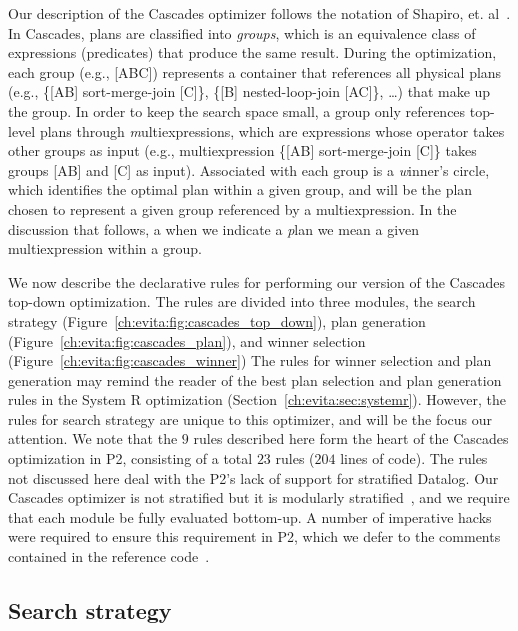 Our description of the Cascades optimizer follows the notation of Shapiro, et.
al~\cite{Shapiro-opt}.  In Cascades, plans are classified into {\em groups},
which is an equivalence class of expressions (predicates) that produce the same
result.  During the optimization, each group (e.g., [ABC]) represents a
container that references all physical plans (e.g., \{[AB] sort-merge-join
[C]\}, \{[B] nested-loop-join [AC]\}, \ldots) that make up the group.  In order
to keep the search space small, a group only references top-level plans through
{\emph multiexpressions}, which are expressions whose operator takes other
groups as input (e.g., multiexpression \{[AB] sort-merge-join [C]\} takes groups [AB] and
[C] as input).  Associated with each group is a {\emph winner's circle}, which
identifies the optimal plan within a given group, and will be the plan chosen
to represent a given group referenced by a multiexpression.  In the discussion
that follows, a when we indicate a {\emph plan} we mean a given multiexpression
within a group.

We now describe the declarative rules for performing our version of the
Cascades top-down optimization.  The rules are divided into three modules, the
search strategy (Figure~\ref{ch:evita:fig:cascades_top_down}), plan generation
(Figure~\ref{ch:evita:fig:cascades_plan}), and winner selection
(Figure~\ref{ch:evita:fig:cascades_winner}) The rules for winner selection and
plan generation may remind the reader of the best plan selection and plan
generation rules in the System R optimization
(Section~\ref{ch:evita:sec:systemr}).  However, the rules for search strategy
are unique to this optimizer, and will be the focus our attention.
We note that the $9$ rules described here form the
heart of the Cascades optimization in P2, consisting of a total $23$ rules
($204$ lines of code).  The rules not discussed here deal with the P2's lack of
support for stratified Datalog.  Our Cascades optimizer is not stratified but
it is modularly stratified~\cite{rossmodular}, and we require that
each module be fully evaluated bottom-up.  A number of imperative hacks were
required to ensure this requirement in P2, which we defer to the comments
contained in the reference code~\cite{p2code}.

\subsection{Search strategy}

